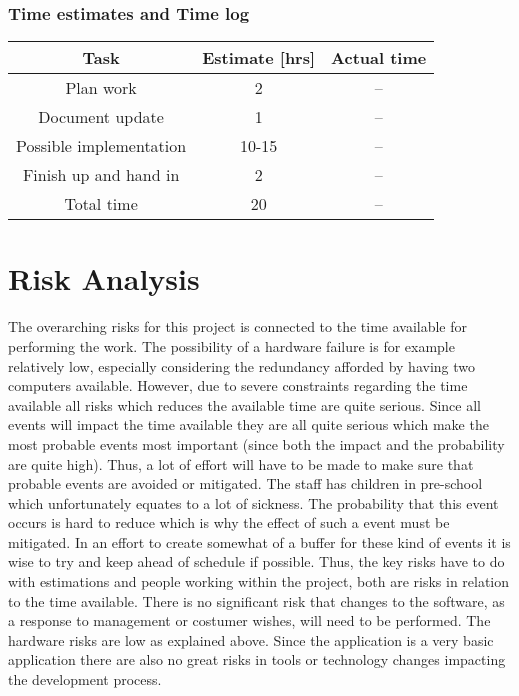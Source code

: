 \documentclass[12pt, letterpaper]{article}
\begin{document}
\subsubsection{Time estimates and Time log}
\begin{center}
	\begin{tabular}{|c|c|c|} 
		\hline
		Task & Estimate [hrs] & Actual time \\ [0.5ex] 
		\hline\hline
		Plan work & 2 & -- \\ 
		\hline
		Document update & 1 & --\\
		\hline 
		Possible implementation & 10-15 & -- \\ 
		\hline
		Finish up and hand in & 2 & --\\ 
		\hline 
		Total time & 20 & --\\ [1ex]
		\hline
		
	\end{tabular}
\end{center}
\newpage
\section{Risk Analysis}
The overarching risks for this project is connected to the time available for performing the work. The possibility of a hardware failure is for example relatively low, especially considering the redundancy afforded by having two computers available. However, due to severe constraints regarding the time available all risks which reduces the available time are quite serious. Since all events will impact the time available they are all quite serious which make the most probable events most important (since both the impact and the probability are quite high). Thus, a lot of effort will have to be made to make sure that probable events are avoided or mitigated. The staff has children in pre-school which unfortunately equates to a lot of sickness. The probability that this event occurs is hard to reduce which is why the effect of such a event must be mitigated. In an effort to create somewhat of a buffer for these kind of events it is wise to try and keep ahead of schedule if possible.
\newline
\newline
Thus, the key risks have to do with estimations and people working within the project, both are risks in relation to the time available. There is no significant risk that changes to the software, as a response to management or costumer wishes, will need to be performed. The hardware risks are low as explained above. Since the application is a very basic application there are also no great risks in tools or technology changes impacting the development process. 
\end{document}
